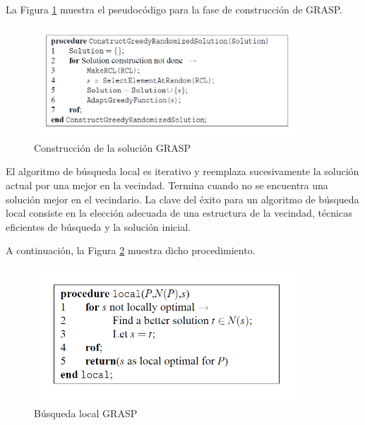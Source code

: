 \documentclass[a4paper,12pt]{book}
\begin{document}
		La Figura \ref{GRASPconstructionphase} muestra el pseudocódigo para la fase de construcción de GRASP.
	
		\begin{figure}[h]
			\centering
			\includegraphics[width=10cm]{./Graphics/GRASPconstructionphase.png}
			\caption{Construcción de la solución GRASP}
			\label{GRASPconstructionphase}
		\end{figure}
	
		El algoritmo de búsqueda local es iterativo y reemplaza sucesivamente la solución actual por una mejor en la vecindad. Termina cuando no se encuentra una solución mejor en el vecindario. La clave del éxito para un algoritmo de búsqueda local consiste en la elección adecuada de una estructura de la vecindad, técnicas eficientes de búsqueda y la solución inicial.
		
		A continuación, la Figura \ref{GRASPlocal} muestra dicho procedimiento.
		
		\begin{figure}[h]
			\centering
			\includegraphics[width=10cm]{./Graphics/GRASPlocal.png}
			\caption{Búsqueda local GRASP}
			\label{GRASPlocal}
		\end{figure}
	
\end{document}
